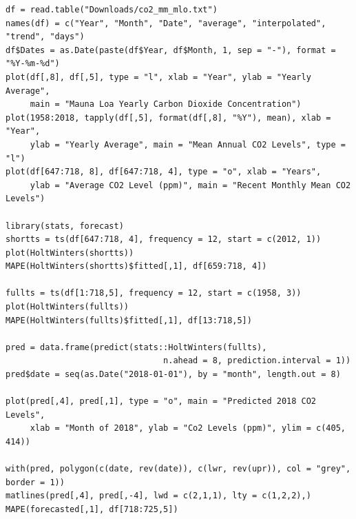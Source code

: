 \documentclass{article}
\begin{document}
\begin{verbatim}
df = read.table("Downloads/co2_mm_mlo.txt")
names(df) = c("Year", "Month", "Date", "average", "interpolated", "trend", "days")
df$Dates = as.Date(paste(df$Year, df$Month, 1, sep = "-"), format = "%Y-%m-%d")
plot(df[,8], df[,5], type = "l", xlab = "Year", ylab = "Yearly Average", 
     main = "Mauna Loa Yearly Carbon Dioxide Concentration")
plot(1958:2018, tapply(df[,5], format(df[,8], "%Y"), mean), xlab = "Year", 
     ylab = "Yearly Average", main = "Mean Annual CO2 Levels", type = "l")
plot(df[647:718, 8], df[647:718, 4], type = "o", xlab = "Years", 
     ylab = "Average CO2 Level (ppm)", main = "Recent Monthly Mean CO2 Levels")
    
library(stats, forecast)
shortts = ts(df[647:718, 4], frequency = 12, start = c(2012, 1))
plot(HoltWinters(shortts))
MAPE(HoltWinters(shortts)$fitted[,1], df[659:718, 4])

fullts = ts(df[1:718,5], frequency = 12, start = c(1958, 3))
plot(HoltWinters(fullts))
MAPE(HoltWinters(fullts)$fitted[,1], df[13:718,5])

pred = data.frame(predict(stats::HoltWinters(fullts), 
                                n.ahead = 8, prediction.interval = 1))
pred$date = seq(as.Date("2018-01-01"), by = "month", length.out = 8)

plot(pred[,4], pred[,1], type = "o", main = "Predicted 2018 CO2 Levels",
     xlab = "Month of 2018", ylab = "Co2 Levels (ppm)", ylim = c(405, 414))

with(pred, polygon(c(date, rev(date)), c(lwr, rev(upr)), col = "grey", border = 1))
matlines(pred[,4], pred[,-4], lwd = c(2,1,1), lty = c(1,2,2),)
MAPE(forecasted[,1], df[718:725,5])

\end{verbatim}
\end{document}
